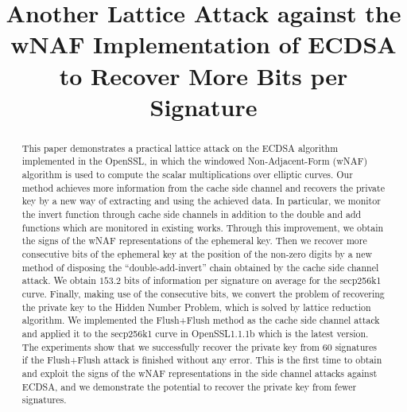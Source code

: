 \documentclass[runningheads]{llncs}
\begin{document}
%
\title{Another Lattice Attack against the wNAF Implementation of ECDSA to Recover More Bits per Signature}
%
%
\maketitle              %
%
\begin{abstract}
This paper demonstrates a practical lattice attack on the ECDSA algorithm implemented in the OpenSSL, in which the windowed Non-Adjacent-Form (wNAF) algorithm is used to compute the scalar multiplications over elliptic curves.
Our method achieves more information from the cache side channel and
    recovers the private key by a new way of extracting and using the achieved data.
In particular, we monitor the invert function through cache side channels
    in addition to the double and add functions which are monitored in existing works.
Through this improvement, we obtain the signs of the wNAF representations of the ephemeral key.
Then we recover more consecutive bits of the ephemeral key at the position of the non-zero digits by a new method of disposing the ``double-add-invert'' chain obtained by the cache side channel attack.
We obtain $153.2$ bits of information per signature on average for the secp256k1 curve.
Finally, making use of the consecutive bits,
 we convert the problem of recovering the private key to the Hidden Number Problem,
 which is solved by lattice reduction algorithm.
We implemented the Flush+Flush method as the cache side channel attack and applied it to the secp256k1 curve in OpenSSL1.1.1b which is the latest version.
The experiments show that we successfully recover the private key from $60$ signatures if the Flush+Flush attack is finished without any error.
This is the first time to obtain and exploit the signs of the wNAF representations
    in the side channel attacks against ECDSA,
    and we demonstrate the potential to recover the private key from fewer signatures.

\end{abstract}
\end{document}
